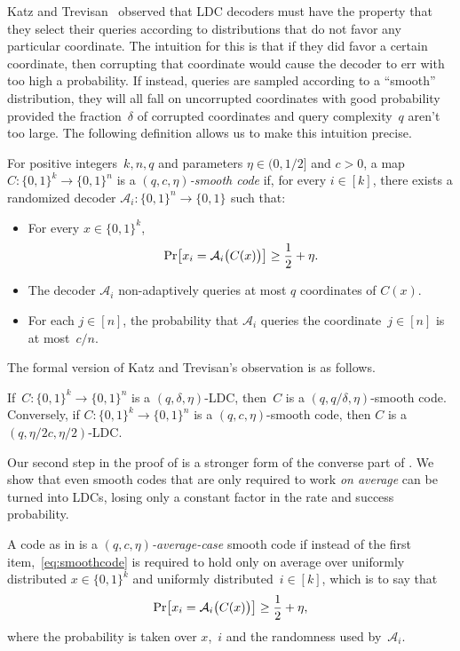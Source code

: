 \documentclass{toc}
\newcommand{\bset}[1]{\{0,1\}^{#1}} %
\renewcommand{\Pr}{\mbox{\rm Pr}}
\newcommand{\cA}{{\mathcal A}}
\newcommand{\beq}{\begin{equation}}
\newcommand{\eeq}{\end{equation}}
\newcommand{\beqn}{\begin{equation*}}
\newcommand{\eeqn}{\end{equation*}}
\begin{document}
Katz and Trevisan~\cite{Katz:2000} observed that LDC decoders must have the property that they select their queries according to distributions that do not favor any particular coordinate.
The intuition for this is that if they did favor a certain coordinate, then corrupting that coordinate would cause the decoder to err with too high a probability.
If instead, queries are sampled according to a ``smooth'' distribution, they will all fall on uncorrupted coordinates with good probability provided the fraction~$\delta$ of corrupted coordinates %
and query complexity~$q$ aren't too large.
The following definition allows us to make this intuition precise.

\begin{definition}\label{def:smoothcode}
For positive integers~$k, n,q$ and parameters $\eta\in (0,1/2]$ and $c>0$, a map $C: \bset{k}\to\bset{n}$ is a \emph{$(q,c,\eta)$-smooth code} if, for every $i\in[k]$, there exists a randomized decoder $\mathcal A_i:\bset{n}\to\bset{}$ such that:
\begin{itemize}
\item For every $x\in\bset{k}$,
	\beq\label{eq:smoothcode}
	\Pr\big[x_i=\cA_i\big(C(x)\big)\big]\ge \frac{1}{2}+\eta.
	\eeq
\item The decoder $\mathcal{A}_i$ non-adaptively queries at most $q$ coordinates of $C(x)$.
\item For each $j\in[n]$, the probability that $\mathcal A_i$ queries the coordinate~$j\in[n]$ is at most~$c/n$.
\end{itemize}
\end{definition}

The formal version of Katz and Trevisan's observation is as follows.

%
%
\begin{theorem}
\label{thm:ldctosmooth}
If~$C:\bset{k}\to\bset{n}$ is a $(q,\delta,\eta)$-LDC, 
then~$C$ is
%
%
a $(q,q/\delta,\eta)$-smooth code. 
Conversely, if $C:\bset{k}\to\bset{n}$ is a $(q,c,\eta)$-smooth code,
then $C$ is
%
%
a $(q,\eta/2c,\eta/2)$-LDC. 
\end{theorem}

Our second step in the proof of  is a stronger form of the converse part of . We show that even smooth codes that are only required to work \emph{on average} can be turned into LDCs, losing only a constant factor in the rate and success probability.

\begin{definition}
A code as in  is a \emph{$(q,c,\eta)$-average-case} smooth code if instead of the first item,~\eqref{eq:smoothcode} is required to hold only on average over uniformly distributed $x\in\bset{k}$ and uniformly distributed~$i\in[k]$,
which is to say that
\beqn
\Pr\big[x_i = \mathcal A_i\big(C(x)\big)\big] \geq \frac{1}{2} + \eta,
\eeqn
where the probability is taken over $x$,~$i$ and the randomness used by~$\mathcal A_i$.
\end{definition}
\end{document}
